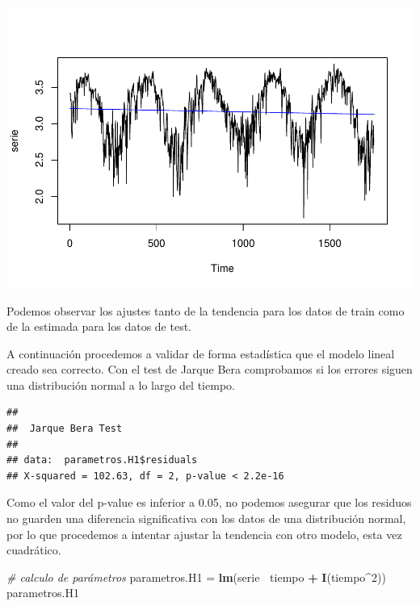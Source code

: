 \documentclass[]{article}
\newenvironment{Shaded}{\begin{snugshade}}{\end{snugshade}}
\newcommand{\KeywordTok}[1]{\textcolor[rgb]{0.13,0.29,0.53}{\textbf{#1}}}
\newcommand{\DecValTok}[1]{\textcolor[rgb]{0.00,0.00,0.81}{#1}}
\newcommand{\StringTok}[1]{\textcolor[rgb]{0.31,0.60,0.02}{#1}}
\newcommand{\CommentTok}[1]{\textcolor[rgb]{0.56,0.35,0.01}{\textit{#1}}}
\newcommand{\OperatorTok}[1]{\textcolor[rgb]{0.81,0.36,0.00}{\textbf{#1}}}
\newcommand{\NormalTok}[1]{#1}
\begin{document}
\includegraphics{exercise2_files/figure-latex/unnamed-chunk-13-1.pdf}

Podemos observar los ajustes tanto de la tendencia para los datos de
train como de la estimada para los datos de test.

A continuación procedemos a validar de forma estadística que el modelo
lineal creado sea correcto. Con el test de Jarque Bera comprobamos si
los errores siguen una distribución normal a lo largo del tiempo.

\begin{Shaded}
\end{Shaded}

\begin{verbatim}
## 
##  Jarque Bera Test
## 
## data:  parametros.H1$residuals
## X-squared = 102.63, df = 2, p-value < 2.2e-16
\end{verbatim}

Como el valor del p-value es inferior a 0.05, no podemos asegurar que
los residuos no guarden una diferencia significativa con los datos de
una distribución normal, por lo que procedemos a intentar ajustar la
tendencia con otro modelo, esta vez cuadrático.

\begin{Shaded}
\begin{Highlighting}[]
\CommentTok{# calculo de parámetros}
\NormalTok{parametros.H1 =}\StringTok{ }\KeywordTok{lm}\NormalTok{(serie }\OperatorTok{~}\NormalTok{tiempo }\OperatorTok{+}\StringTok{ }\KeywordTok{I}\NormalTok{(tiempo}\OperatorTok{^}\DecValTok{2}\NormalTok{)) }
\NormalTok{parametros.H1}
\end{Highlighting}
\end{Shaded}
\end{document}
